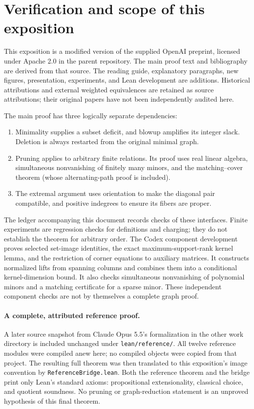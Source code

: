 \section{Verification and scope of this exposition}
This exposition is a modified version of the supplied OpenAI preprint,
licensed under Apache 2.0 in the parent repository. The main proof text and
bibliography are derived from that source. The reading guide, explanatory
paragraphs, new figures, presentation, experiments, and Lean development
are additions. Historical attributions and external weighted equivalences
are retained as source attributions; their original papers have not been
independently audited here.

The main proof has three logically separate dependencies:
\begin{enumerate}
\item Minimality supplies a subset deficit, and blowup amplifies its integer
slack. Deletion is always restarted from the original minimal graph.
\item Pruning applies to arbitrary finite relations. Its proof uses real
linear algebra, simultaneous nonvanishing of finitely many minors, and the
matching--cover theorem (whose alternating-path proof is included).
\item The extremal argument uses orientation to make the diagonal pair
compatible, and positive indegrees to ensure its fibers are proper.
\end{enumerate}
The ledger accompanying this document records checks of these interfaces.
Finite experiments are regression checks for definitions and charging;
they do not establish the theorem for arbitrary order. The Codex component development proves selected set-image identities,
the exact maximum-support-rank kernel lemma, and the restriction of corner
equations to auxiliary matrices. It constructs normalized lifts from
spanning columns and combines them into a conditional kernel-dimension
bound. It also checks simultaneous nonvanishing of polynomial minors and
a matching certificate for a sparse minor. These independent component
checks are not by themselves a complete graph proof.

\paragraph{A complete, attributed reference proof.}
A later source snapshot from Claude Opus 5.5's formalization in the other
work directory is included unchanged under \texttt{lean/reference/}.
All twelve reference modules were compiled anew here; no compiled objects
were copied from that project. The resulting full theorem was then
translated to this exposition's image convention by
\texttt{ReferenceBridge.lean}. Both the reference theorem and the bridge
print only Lean's standard axioms: propositional extensionality, classical
choice, and quotient soundness. No pruning or graph-reduction statement is
an unproved hypothesis of this final theorem.

